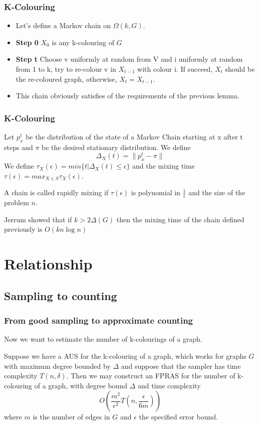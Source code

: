 \documentclass[table, usenames,dvipsnames,svgnames]{beamer}
\begin{document}
\begin{frame}
    \frametitle{K-Colouring}
    \pause 
    \begin{itemize}
        \item Let's define a Markov chain on $\Omega(k, G)$.\pause
        \item \textbf{Step 0} $X_0$ is any k-colouring of $G$
        \item \textbf{Step t} Choose v uniformly at random from V and i uniformly at random from 1 to k, try to re-colour v in $X_{t-1}$ with colour i. If succeed, $X_t$ should be the re-coloured graph, otherwise, $X_{t}=X_{t-1}$.\pause
        \item This chain obviously satisfies of the requirements of the previous lemma.
    \end{itemize}
\end{frame}

\begin{frame}
    \frametitle{K-Colouring}
    \pause 
    \begin{definition}
        Let $p^t_x$ be the distribution of the state of a Markov Chain starting at x after t steps and $\pi$ be the desired stationary distribution. We define
        $$
        \Delta_X(t)=\|p_x^t-\pi\|
        $$
        We define $\tau_{X}(\epsilon)=min\{t|\Delta_{X}(t)\leq \epsilon\}$ and the mixing time $\tau(\epsilon)=max_{X\in S}\tau_X(\epsilon)$.

        A chain is called rapidly mixing if $\tau(\epsilon)$ is polynomial in $\frac{1}{\epsilon}$ and the size of the problem $n$.
    \end{definition}
    Jerrum showed that if $k > 2\Delta(G)$ then the mixing time of the chain defined previously is $O(kn\log n)$
\end{frame}

\section{Relationship}

\subsection{Sampling to counting}

\begin{frame}
    \frametitle{From good sampling to approximate counting}
    \pause 
    Now we want to estimate the number of k-colourings of a graph.
    \begin{theorem}
        Suppose we have a AUS for the k-colouring of a graph, which works for graphs $G$ with maximum degree bounded by $\Delta$ and suppose that the sampler has time complexity $T(n,\delta)$. Then we may construct an FPRAS for the number of k-colouring of a graph, with degree bound $\Delta$ and time complexity 
        $$
        O(\frac{m^2}{\epsilon ^2}T(n, \frac{\epsilon}{6m}))
        $$
        where $m$ is the number of edges in $G$ and $\epsilon$ the specified error bound.
    \end{theorem}
\end{frame}
\end{document}
